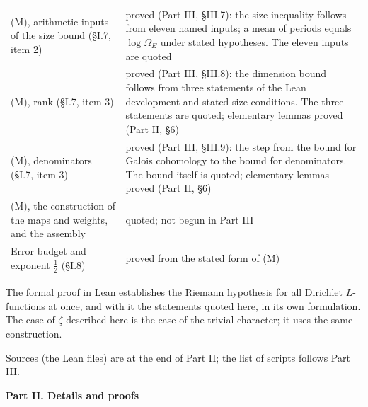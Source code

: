 \documentclass[11pt,letterpaper]{article}
\renewcommand{\theequation}{I.\arabic{equation}}
\newcounter{partno}\setcounter{partno}{1}
\begin{document}
\begin{center}
\begin{tabular}{p{}p{}}
(M), arithmetic inputs of the size bound (\S I.7, item 2) & proved (Part III, \S III.7): the size inequality follows from eleven named inputs; a mean of periods equals $\log\Omega_E$ under stated hypotheses. The eleven inputs are quoted\\
(M), rank (\S I.7, item 3) & proved (Part III, \S III.8): the dimension bound follows from three statements of the Lean development and stated size conditions. The three statements are quoted; elementary lemmas proved (Part II, \S6)\\
(M), denominators (\S I.7, item 3) & proved (Part III, \S III.9): the step from the bound for Galois cohomology to the bound for denominators. The bound itself is quoted; elementary lemmas proved (Part II, \S6)\\
(M), the construction of the maps and weights, and the assembly & quoted; not begun in Part III\\
Error budget and exponent $\frac12$ (\S I.8) & proved from the stated form of (M)\\
\bottomrule
\end{tabular}
\end{center}

\noindent The formal proof in Lean establishes the Riemann hypothesis for all Dirichlet $L$-functions at
once, and with it the statements quoted here, in its own formulation. The case of $\zeta$ described here is
the case of the trivial character; it uses the same construction.

\medskip
\noindent Sources (the Lean files) are at the end of Part II; the list of scripts follows Part III.

\newpage
\setcounter{equation}{0}\renewcommand{\theequation}{II.\arabic{equation}}
\begin{center}\Large\bfseries Part II. Details and proofs\end{center}
\end{document}
